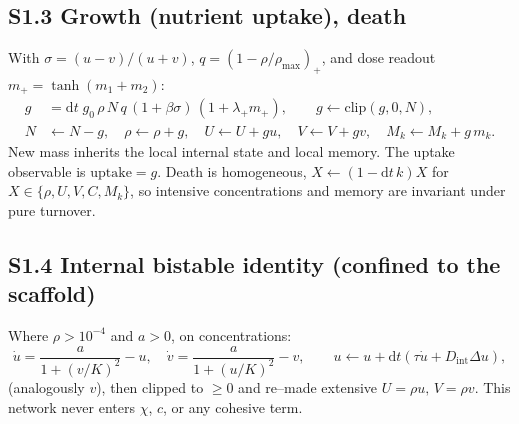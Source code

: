 \documentclass[11pt]{article}
\begin{document}
\subsection*{S1.3 Growth (nutrient uptake), death}
With $\sigma=(u-v)/(u+v)$, $q=(1-\rho/\rho_{\max})_+$, and dose readout $m_+=\tanh(m_1+m_2)$:
\begin{align}
g&=\mathrm{d}t\;g_0\,\rho\,N\,q\,(1+\beta\sigma)\,(1+\lambda_+ m_+),\qquad g\leftarrow\mathrm{clip}(g,0,N),\\
N&\leftarrow N-g,\quad \rho\leftarrow\rho+g,\quad U\leftarrow U+gu,\quad V\leftarrow V+gv,\quad M_k\leftarrow M_k+g\,m_k.
\end{align}
New mass inherits the local internal state and local memory. The uptake observable is $\mathrm{uptake}=g$.
Death is homogeneous, $X\leftarrow(1-\mathrm{d}t\,k)X$ for $X\in\{\rho,U,V,C,M_k\}$, so intensive
concentrations and memory are invariant under pure turnover.

\subsection*{S1.4 Internal bistable identity (confined to the scaffold)}
Where $\rho>10^{-4}$ and $a>0$, on concentrations:
\begin{equation}
\dot u=\frac{a}{1+(v/K)^2}-u,\quad \dot v=\frac{a}{1+(u/K)^2}-v,\qquad
u\leftarrow u+\mathrm{d}t(\tau\dot u+D_{\mathrm{int}}\Delta u),
\end{equation}
(analogously $v$), then clipped to $\ge0$ and re--made extensive $U=\rho u,\,V=\rho v$. This network never
enters $\chi$, $c$, or any cohesive term.
\end{document}
